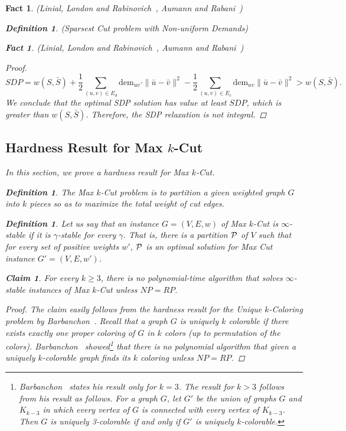 \documentclass[twoside,leqno,twocolumn]{article}
\newcommand {\texorpdfstring} [2] {{#1}}
\newtheorem{Definition}[theorem]{Definition}
\newtheorem{fact}[theorem]{Fact}
\newtheorem{claim}{Claim}[section]
\begin{document}
\begin{fact}{\sc (Linial, London and Rabinovich~\cite{LLR}, Aumann and Rabani~\cite{AR})}
\begin{Definition} {\sc (Sparsest Cut problem with Non-uniform Demands)}
\begin{fact}{\sc (Linial, London and Rabinovich~\cite{LLR}, Aumann and Rabani~\cite{AR})}
\begin{proof}
\else
$$SDP = w(S, \bar S) +  \frac{1}{2}\sum_{(u,v) \in E_d} \mathrm{dem}_{uv} \cdot \|\bar u - \bar v\|^2 -  \frac{1}{2}\sum_{(u,v) \in E_c} \mathrm{dem}_{uv} \|\bar u - \bar v\|^2 > w(S,\bar S).$$
\fi
We conclude that the optimal SDP solution has value at least $SDP$, which is greater than $w(S,\bar S)$.
Therefore, the SDP relaxation is not integral.

\end{proof}

\subsection{Hardness Result for Max \texorpdfstring{$k$}{k}-Cut}
\label{sec:max-k-cut}
In this section, we prove a hardness result for Max $k$-Cut.  
\begin{Definition}
The Max $k$-Cut problem is to partition a given weighted graph $G$ into $k$ pieces so as to maximize the total weight of cut edges.
\end{Definition}

\begin{Definition}
Let us say that an instance $G=(V,E,w)$ of Max $k$-Cut is $\infty$-stable if it is $\gamma$-stable for every $\gamma$.
That is, there is a partition $\cal P$ of $V$ such that for every set of positive weights $w'$, $\cal P$ is an optimal solution
for Max Cut instance $G'=(V,E,w')$.
\end{Definition}

\begin{claim}\label{claim:neg-max-k-cut}
For every $k \geq 3$, there is no polynomial-time algorithm that solves $\infty$-stable instances of Max $k$-Cut unless $NP=RP$.
\end{claim}
\begin{proof}
The claim easily follows from the hardness result for the Unique $k$-Coloring problem by Barbanchon~\cite{Barbanchon}.
Recall that a graph $G$ is uniquely $k$ colorable if there exists exactly one proper coloring of $G$ in $k$ colors
(up to permutation of the colors).
Barbanchon~\cite{Barbanchon} showed\footnote{Barbanchon~\cite{Barbanchon} states his result only for $k=3$. The result for $k > 3$ follows
  from his result as follows. For a graph $G$, let $G'$ be the union of graphs $G$ and $K_{k-3}$ in which every vertex of $G$ is connected
  with every vertex of $K_{k-3}$. Then $G$ is uniquely 3-colorable if and only if $G'$ is uniquely $k$-colorable.}
that there is no polynomial algorithm that given a uniquely $k$-colorable graph finds its $k$ coloring unless $NP=RP$.


\end{proof}
\end{fact}
\end{Definition}
\end{fact}
\end{document}
